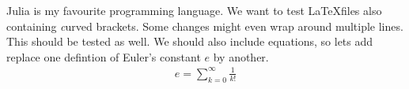 Julia is  my favourite programming language.
We want to test \LaTeX files also containing {\textit curved brackets}.
Some changes might even wrap around multiple lines.
This should be tested as well.
We should also include equations, so lets add replace one defintion of Euler's constant $e$ by another.
\begin{align}
e = \sum_{k = 0}^{\infty} \frac{1}{k!}
\end{align}
